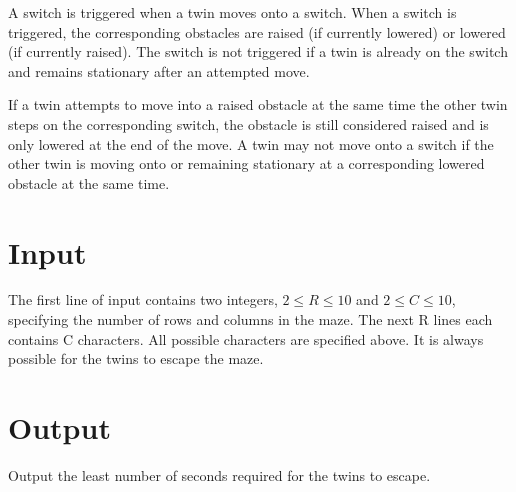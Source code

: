 A switch is triggered when a twin moves onto a switch.  When a switch
is triggered, the corresponding obstacles are raised (if currently
lowered) or lowered (if currently raised).  The switch is not triggered if a twin is already on the
switch and remains stationary after an attempted move.

If a twin attempts to move into a raised obstacle at the same time the
other twin steps on the corresponding switch, the obstacle is still
considered raised and is only lowered at the end of the move.  A twin
may not move onto a switch if the other twin is moving onto or
remaining stationary at a corresponding lowered obstacle at the same
time.

\section*{Input} 
The first line of input contains two integers,
$2 \leq R \leq 10$ and $2 \leq C \leq 10$, specifying the number
of rows and columns in the maze.
The next R lines each contains C characters.  All possible characters
are specified above.  It is always possible for the twins to escape
the maze.


\section*{Output} 

Output the least number of seconds required for the twins to escape. 
